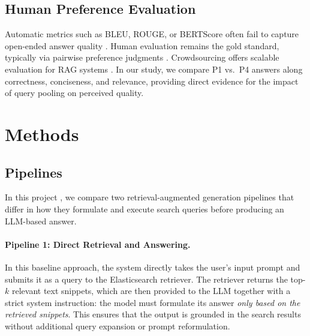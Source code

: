 \documentclass[manuscript,screen]{acmart}
\begin{document}
\begin{CCSXML}
	\subsection{Human Preference Evaluation}
	\label{subsec:human-preference-eval}
	Automatic metrics such as BLEU, ROUGE, or BERTScore often fail to capture open-ended answer quality \cite{post-2018-call,lin-2004-rouge,zhang2020bertscoreevaluatingtextgeneration}. Human evaluation remains the gold standard, typically via pairwise preference judgments \cite{bai2022traininghelpfulharmlessassistant,stiennon2022learningsummarizehumanfeedback}. Crowdsourcing offers scalable evaluation for RAG systems \cite{Gienapp_2025}. In our study, we compare P1 vs.~P4 answers along correctness, conciseness, and relevance, providing direct evidence for the impact of query pooling on perceived quality.

\section{Methods}

	\subsection{Pipelines}
	\label{subsec:pipelines}
	
	In this project \cite{repo}, we compare two retrieval-augmented generation pipelines that
	differ in how they formulate and execute search queries before producing an
	LLM-based answer.
	
	\paragraph{Pipeline 1: Direct Retrieval and Answering.}
	In this baseline approach, the system directly takes the user’s input prompt
	and submits it as a query to the Elasticsearch retriever. The retriever returns the top-$k$ relevant text
	snippets, which are then provided to the LLM together with a
	strict system instruction: the model must formulate its answer \emph{only based
	on the retrieved snippets}. This ensures that the output is grounded in the
	search results without additional query expansion or prompt reformulation.
	
	\begin{figure}[H] %
		\centering
\end{figure}
\end{CCSXML}
\end{document}

